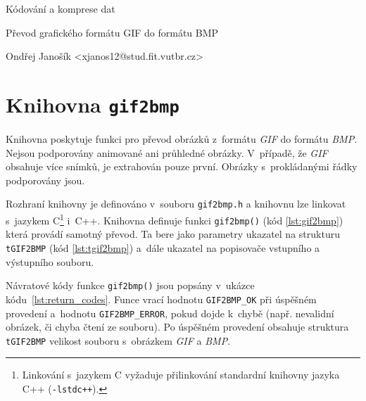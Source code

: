 \documentclass[12pt,a4paper,notitlepage,final]{article}
\begin{document}
\begin{center}
  \begin{Large}
    Kódování a komprese dat \\
  \end{Large}
  \begin{large}
    Převod grafického formátu GIF do formátu BMP
  \end{large}
\end{center}

\begin{center}
  Ondřej Janošík <xjanos12@stud.fit.vutbr.cz>
\end{center}

\section{Knihovna \texttt{gif2bmp}}

Knihovna poskytuje funkci pro převod obrázků z~formátu \textit{GIF} do
formátu \textit{BMP}.
Nejsou podporovány animované ani průhledné obrázky. V~případě, že \textit{GIF}
obsahuje více snímků, je extrahován pouze první. Obrázky s~prokládanými řádky
podporovány jsou.

Rozhraní knihovny je definováno v~souboru \texttt{gif2bmp.h} a knihovnu lze
linkovat s~jazykem C\footnote{Linkování s~jazykem C vyžaduje přilinkování
standardní knihovny jazyka C++ (\texttt{-lstdc++}).} i~C++. Knihovna definuje
funkci \texttt{gif2bmp()} (kód \ref{lst:gif2bmp}) která provádí samotný převod.
Ta bere jako parametry ukazatel na strukturu \texttt{tGIF2BMP}
(kód \ref{lst:tgif2bmp}) a~dále ukazatel na popisovače vstupního a výstupního
souboru.

Návratové kódy funkce \texttt{gif2bmp()} jsou popsány v~ukázce
kódu~\ref{lst:return_codes}.
Funce vrací hodnotu \texttt{GIF2BMP\_OK} při úspěšném provedení a~hodnotu
\texttt{GIF2BMP\_ERROR}, pokud dojde k~chybě (např. nevalidní obrázek, či chyba
čtení ze souboru). Po úspěšném provedení obsahuje struktura \texttt{tGIF2BMP}
velikost souboru s~obrázkem \textit{GIF} a \textit{BMP}.






\end{document}
